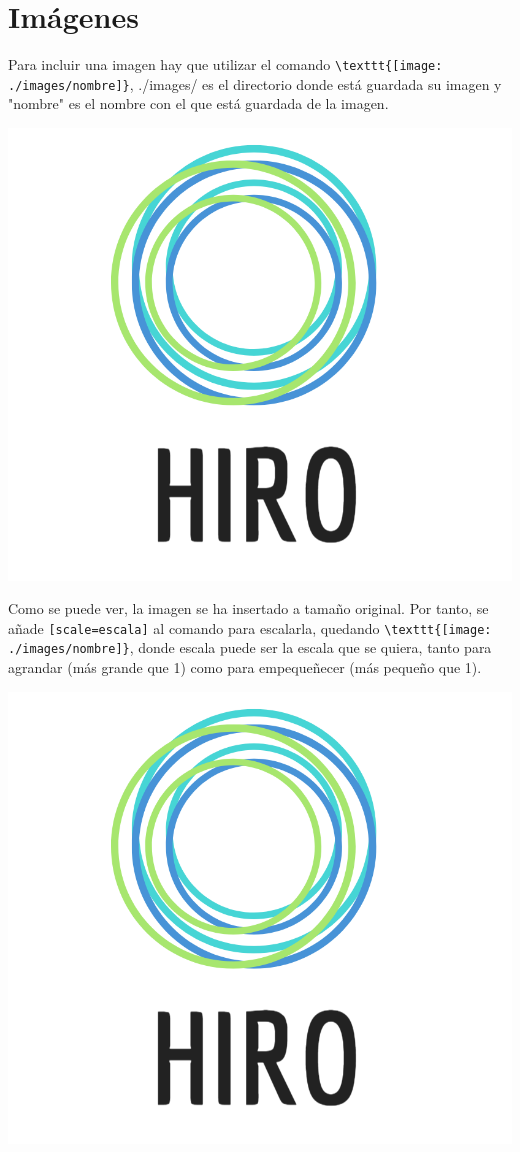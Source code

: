 \chapter{Imágenes}

Para incluir una imagen hay que utilizar el comando \verb!\texttt{[image: ./images/nombre]}!, ./images/ es el directorio donde está guardada su imagen y "nombre" es el nombre con el que está guardada de la imagen.

\includegraphics{./images/HIRO}

Como se puede ver, la imagen se ha insertado a tamaño original. Por tanto, se añade \verb![scale=escala]! al comando para escalarla, quedando \verb!\texttt{[image: ./images/nombre]}!, donde escala puede ser la escala que se quiera, tanto para agrandar (más grande que 1) como para empequeñecer (más pequeño que 1).

\includegraphics[scale=0.35]{./images/HIRO}

